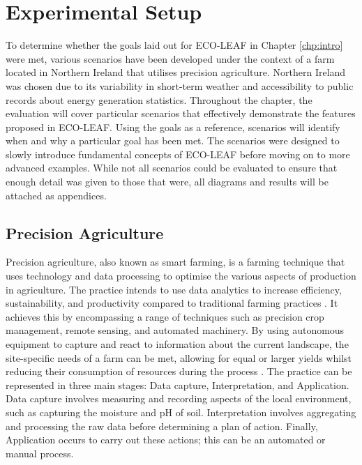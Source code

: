 \documentclass{l4proj}
\begin{document}
\section{Experimental Setup}\label{eval:sec:scenarios}
To determine whether the goals laid out for ECO-LEAF in Chapter \ref{chp:intro} were met, various scenarios have been developed under the context of a farm located in Northern Ireland that utilises precision agriculture.
Northern Ireland was chosen due to its variability in short-term weather and accessibility to public records about energy generation statistics.
Throughout the chapter, the evaluation will cover particular scenarios that effectively demonstrate the features proposed in ECO-LEAF.
Using the goals as a reference, scenarios will identify when and why a particular goal has been met.
The scenarios were designed to slowly introduce fundamental concepts of ECO-LEAF before moving on to more advanced examples.
While not all scenarios could be evaluated to ensure that enough detail was given to those that were, all diagrams and results will be attached as appendices.

\subsection{Precision Agriculture}\label{eval:subsec:precision-agriculture}
Precision agriculture, also known as smart farming, is a farming technique that uses technology and data processing to optimise the various aspects of production in agriculture.
The practice intends to use data analytics to increase efficiency, sustainability, and productivity compared to traditional farming practices \citep{precison-agriculture}.
It achieves this by encompassing a range of techniques such as precision crop management, remote sensing, and automated machinery.
By using autonomous equipment to capture and react to information about the current landscape, the site-specific needs of a farm can be met, allowing for equal or larger yields whilst reducing their consumption of resources during the process \citep{precison-agriculture}.
The practice can be represented in three main stages: Data capture, Interpretation, and Application.
Data capture involves measuring and recording aspects of the local environment, such as capturing the moisture and pH of soil.
Interpretation involves aggregating and processing the raw data before determining a plan of action.
Finally, Application occurs to carry out these actions; this can be an automated or manual process.
\end{document}
